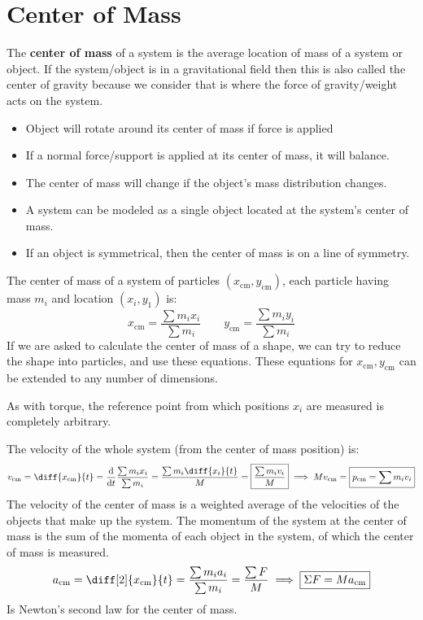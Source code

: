\documentclass{article}
\newcommand{\definition}[1]{\begin{tcolorbox}[colback=red!5!white,colframe=red!75!black,parbox=false] #1 \end{tcolorbox}}
\newcommand{\theorem}[2]{\begin{tcolorbox}[title={#1},colback=blue!5!white,colframe=blue!75!black,parbox=false] #2 \end{tcolorbox}}
\newcommand*{\deriv}[1][x]{\ensuremath{\dfrac{\mathrm{d}}{\mathrm{d}#1}}}
\begin{document}
\section{Center of Mass}
\label{sec:centerofmass}

\definition{The \textbf{center of mass} of a system is the average location of mass of a system or object. If the system/object is in a gravitational field then this is also called the center of gravity because we consider that is where the force of gravity/weight acts on the system.}

\begin{itemize}
	\item Object will rotate around its center of mass if force is applied
	\item If a normal force/support is applied at its center of mass, it will balance.
	\item The center of mass will change if the object's mass distribution changes.
	\item A system can be modeled as a single object located at the system's center of mass.
	\item If an object is symmetrical, then the center of mass is on a line of symmetry.
\end{itemize}

\theorem{Center of mass of system of particles}{The center of mass of a system of particles $( x_\text{cm}, y_\text{cm})$, each particle having mass $m_i$ and location $(x_i,y_1)$ is:
\begin{equation*}
     x_\text{cm}=\frac{\sum m_ix_i}{\sum m_i}
	\qquad  y_\text{cm}=\frac{\sum m_i y_i}{\sum m_i}
\end{equation*}
If we are asked to calculate the center of mass of a shape, we can try to reduce the shape into particles, and use these equations. These equations for $ x_\text{cm}, y_\text{cm}$ can be extended to any number of dimensions.}

As with torque, the reference point from which positions $x_i$ are measured is completely arbitrary.

The velocity of the whole system (from the center of mass position) is:
\begin{equation*}
	 v_\text{cm}
	=\diff{ x_\text{cm}}{t}
	=\deriv[t] \frac{\sum m_ix_i}{\sum m_i}
	=\frac{\sum m_i \diff{x_i}{t}}{M}
	=\boxed{\frac{\sum m_i v_i}{M}}
	\implies M v_\text{cm}=\boxed{p_\text{cm}=\sum m_iv_i} \\
\end{equation*}
The velocity of the center of mass is a weighted average of the velocities of the objects that make up the system. The momentum of the system at the center of mass is the sum of the momenta of each object in the system, of which the center of mass is measured.
\begin{equation*}
	a_\text{cm}
	=\diff[2]{ x_\text{cm}}{t}
	=\frac{\sum m_ia_i}{\sum m_i}
	=\frac{\sum F}{M}
	\implies \boxed{\Sigma F=Ma_\text{cm}}
\end{equation*}
Is Newton's second law for the center of mass.
\end{document}
